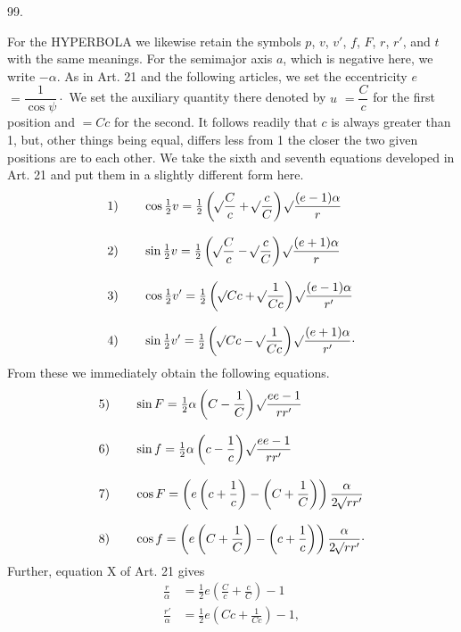 \par{}\medskip
\hypertarget{native-137-article099}{}
\begin{center}99.\end{center}
For the HYPERBOLA we likewise retain the symbols $p$, $v$, $v'$, $f$, $F$, $r$, $r'$, and $t$ with the same meanings. For the semimajor axis $a$, which is negative here, we write $-\alpha$. As in Art. 21 and the following articles, we set the eccentricity $e$ $=\dfrac1{\cos\psi}\mathpunct{\cdot}$ We set the auxiliary quantity there denoted by $u$ $=\dfrac Cc$ for the first position and $=Cc$ for the second. It follows readily that $c$ is always greater than 1, but, other things being equal, differs less from 1 the closer the two given positions are to each other. We take the sixth and seventh equations developed in Art. 21 and put them in a slightly different form here.
\[
\begin{aligned}
\mathrm{1)}\qquad&\cos\tfrac12v=\tfrac12\left(\BareRoot{\dfrac Cc}+\BareRoot{\dfrac cC}\right)\BareRoot{\dfrac{(e-1)\alpha}r}\\[.8em]
\mathrm{2)}\qquad&\sin\tfrac12v=\tfrac12\left(\BareRoot{\dfrac Cc}-\BareRoot{\dfrac cC}\right)\BareRoot{\dfrac{(e+1)\alpha}r}\\[.8em]
\mathrm{3)}\qquad&\cos\tfrac12v'=\tfrac12\left(\BareRoot{Cc}+\BareRoot{\dfrac1{Cc}}\right)\BareRoot{\dfrac{(e-1)\alpha}{r'}}\\[.8em]
\mathrm{4)}\qquad&\sin\tfrac12v'=\tfrac12\left(\BareRoot{Cc}-\BareRoot{\dfrac1{Cc}}\right)\BareRoot{\dfrac{(e+1)\alpha}{r'}}\mathpunct{\cdot}
\end{aligned}
\]
\noindent From these we immediately obtain the following equations.
\[
\begin{aligned}
\mathrm{5)}\qquad&\sin F=\tfrac12\alpha\left(C-\dfrac1C\right)\mathord{{}^{}\!\surd}\dfrac{ee-1}{rr'}\\[.8em]
\mathrm{6)}\qquad&\sin f=\tfrac12\alpha\left(c-\dfrac1c\right)\mathord{{}^{}\!\surd}\dfrac{ee-1}{rr'}\\[.8em]
\mathrm{7)}\qquad&\cos F=\left(e\left(c+\dfrac1c\right)-\left(C+\dfrac1C\right)\right)\dfrac\alpha{2\mathord{{}^{}\!\surd}rr'}\\[.8em]
\mathrm{8)}\qquad&\cos f=\left(e\left(C+\dfrac1C\right)-\left(c+\dfrac1c\right)\right)\dfrac\alpha{2\mathord{{}^{}\!\surd}rr'}\mathpunct{\cdot}
\end{aligned}
\]
\noindent Further, equation X of Art. 21 gives
\[
\begin{aligned}
\frac r\alpha&=\tfrac12e\left(\frac Cc+\frac cC\right)-1\\[.6em]
\frac{r'}\alpha&=\tfrac12e\left(Cc+\frac1{Cc}\right)-1,
\end{aligned}
\]
